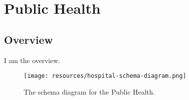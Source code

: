 
\section{Public Health}
\label{sec:public-health}
\subsection{Overview}
\label{ssec:overview}

I am the overview.

\begin{figure}[h!]
  \begin{center}
    \texttt{[image: resources/hospital-schema-diagram.png]}
  \end{center}
  \caption{The schema diagram for the Public Health.}
  \label{fig:ov-diagram}
\end{figure}


